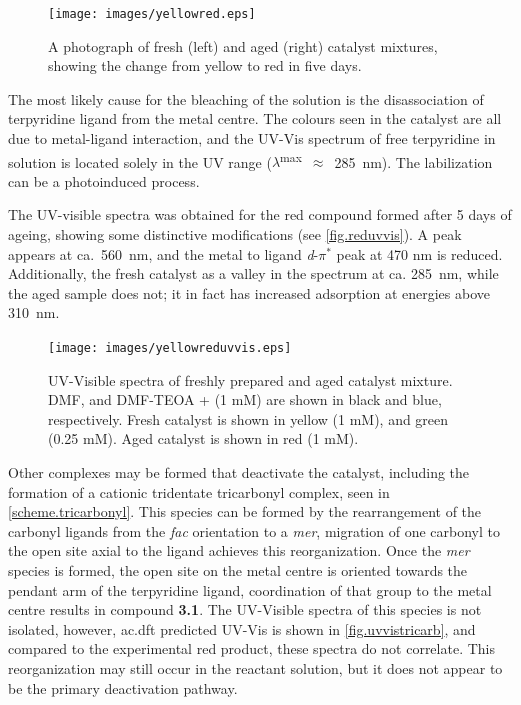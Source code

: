\begin{figure}[!htbp]
 \begin{center}
  \texttt{[image: images/yellowred.eps]}
 \end{center}
 \caption[A photograph of aged and fresh catalytic mixture.]{A photograph of fresh (left) and aged (right) catalyst mixtures, showing the change from yellow to red in five days.}
 \label{fig.yellowred}
\end{figure}

The most likely cause for the bleaching of the solution is the disassociation of terpyridine ligand from the metal centre. The colours seen in the catalyst are all due to metal-ligand interaction, and the UV-Vis spectrum of free terpyridine in solution is located solely in the UV range ($\lambda$\textsuperscript{max}~$\approx$~285~nm)\autocite{martin1956}. The labilization can be a photoinduced process\autocite{zink2001}. 

The UV-visible spectra was obtained for the red compound formed after 5 days of ageing, showing some distinctive modifications (see \autoref{fig.reduvvis}). A peak appears at ca.~560~nm, and the metal to ligand \textit{d}-$\pi^\ast$ peak at 470 nm is reduced. Additionally, the fresh catalyst as a valley in the spectrum at ca. 285~nm, while the aged sample does not; it in fact has increased adsorption at energies above 310~nm. 

\begin{figure}[!htb]
 \begin{center}
  \texttt{[image: images/yellowreduvvis.eps]}
 \end{center}
 \caption[UV-Visible spectra of freshly prepared and aged catalyst mixture.]{UV-Visible spectra of freshly prepared and aged catalyst mixture. DMF, and DMF-TEOA +  (1 mM) are shown in black and blue, respectively. Fresh catalyst is shown in yellow (1 mM), and green (0.25 mM). Aged catalyst is shown in red (1 mM).}
 \label{fig.reduvvis}
\end{figure}

Other complexes may be formed that deactivate the catalyst, including the formation of a cationic tridentate tricarbonyl complex, seen in \autoref{scheme.tricarbonyl}. This species can be formed by the rearrangement of the carbonyl ligands from the \textit{fac} orientation to a \textit{mer}, migration of one carbonyl to the open site axial to the ligand achieves this reorganization. Once the \textit{mer} species is formed, the open site on the metal centre is oriented towards the pendant arm of the terpyridine ligand, coordination of that group to the metal centre results in compound \textbf{3.1}. The UV-Visible spectra of this species is not isolated, however, \gls{ac.dft} predicted UV-Vis is shown in \autoref{fig.uvvistricarb}, and compared to the experimental red product, these spectra do not correlate. This reorganization may still occur in the reactant solution, but it does not appear to be the primary deactivation pathway.

